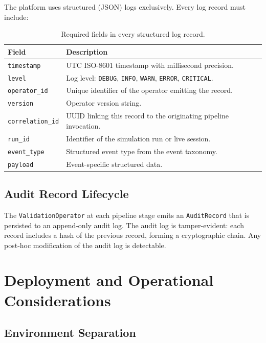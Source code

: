 \documentclass[12pt,openany]{book}
\numberwithin{equation}{chapter}
\theoremstyle{plain}
\theoremstyle{definition}
\theoremstyle{remark}
\begin{document}
The platform uses structured (JSON) logs exclusively. Every log record must
include:

\begin{table}[H]
\centering
\caption{Required fields in every structured log record.}
\label{tab:log_fields}
\small
\begin{tabularx}{\textwidth}{p{4.2cm} p{10.3cm}}
\toprule
\textbf{Field} & \textbf{Description} \\
\midrule
\texttt{timestamp} & UTC ISO-8601 timestamp with millisecond precision. \\
\texttt{level} & Log level: \texttt{DEBUG}, \texttt{INFO}, \texttt{WARN},
    \texttt{ERROR}, \texttt{CRITICAL}. \\
\texttt{operator\_id} & Unique identifier of the operator emitting the record. \\
\texttt{version} & Operator version string. \\
\texttt{correlation\_id} & UUID linking this record to the originating
    pipeline invocation. \\
\texttt{run\_id} & Identifier of the simulation run or live session. \\
\texttt{event\_type} & Structured event type from the event taxonomy. \\
\texttt{payload} & Event-specific structured data. \\
\bottomrule
\end{tabularx}
\end{table}

\section{Audit Record Lifecycle}

The \texttt{ValidationOperator} at each pipeline stage emits an
\texttt{AuditRecord} that is persisted to an append-only audit log.
The audit log is tamper-evident: each record includes a hash of the
previous record, forming a cryptographic chain. Any post-hoc modification
of the audit log is detectable.

\chapter{Deployment and Operational Considerations}

\section{Environment Separation}
\end{document}
